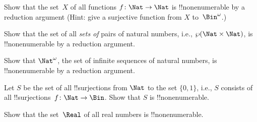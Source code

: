 \documentclass[../../../include/open-logic-section]{subfiles}
\begin{document}
\begin{prob}\label{sfr:siz:red:prob:nat-nat}
  Show that the set~$X$ of all functions $f\colon \Nat \to \Nat$ is
  !!{nonenumerable} by a reduction argument (Hint: give a surjective
  function from $X$ to~$\Bin^\omega$.)
\end{prob}

\begin{prob}
Show that the set of all \emph{sets of} pairs of natural numbers,
i.e., $\Pow{\Nat \times \Nat}$, is !!{nonenumerable} by a reduction
argument.
\end{prob}

\begin{prob}
Show that $\Nat^\omega$, the set of infinite sequences of natural
numbers, is !!{nonenumerable} by a reduction argument.
\end{prob}


\begin{prob}
Let $S$ be the set of all !!{surjection}s from $\Nat$ to the set
$\{0,1\}$, i.e., $S$ consists of all !!{surjection}s~$f \colon \Nat
\to \Bin$.  Show that $S$ is !!{nonenumerable}.
\end{prob}

\begin{prob}
Show that the set~$\Real$ of all real numbers is !!{nonenumerable}.
\end{prob}
\end{document}
